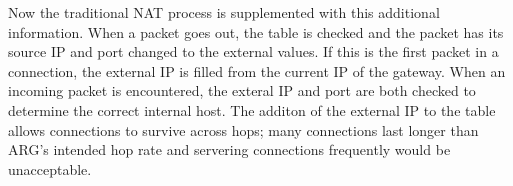 \par Now the traditional \ac{NAT} process is supplemented with this additional information. When a packet goes out, the table is checked and the packet has its source IP and port changed to the external values. If this is the first packet in a connection, the external IP is filled from the current IP of the gateway. When an incoming packet is encountered, the exteral IP and port are both checked to determine the correct internal host. The additon of the external IP to the table allows connections to survive across hops; many connections last longer than \ac{ARG}'s intended hop rate and servering connections frequently would be unacceptable. 

